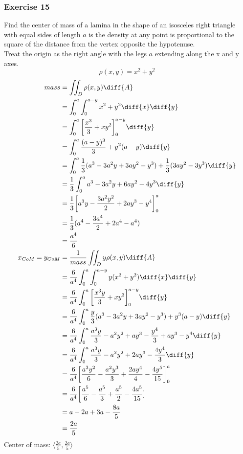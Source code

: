 \documentclass{math}
\begin{document}
\subsubsection*{Exercise 15}
Find the center of mass of a lamina in the shape of an isosceles right triangle
with equal sides of length \( a \) is the density at any point is proportional
to the square of the distance from the vertex opposite the hypotenuse. \\
Treat the origin as the right angle with the legs \( a \) extending along the x
and y axes.
\[ \rho(x,y) = x^2+y^2 \]
\begin{align*}
  mass &= \iint_{D}\rho(x,y)\diff{A} \\
  &= \int_{0}^{a}\int_{0}^{a-y}x^2+y^2\diff{x}\diff{y} \\
  &= \int_{0}^{a}\bigg[\frac{x^3}{3}+xy^2\bigg]_{0}^{a-y}\diff{y} \\
  &= \int_{0}^{a}\frac{(a-y)^3}{3}+y^2(a-y)\diff{y} \\
  &= \int_{0}^{a}
    \frac{1}{3}(a^3-3a^2y+3ay^2-y^3)+\frac{1}{3}(3ay^2-3y^3)\diff{y} \\
  &= \frac{1}{3}\int_{0}^{a}a^3-3a^2y+6ay^2-4y^3\diff{y} \\
  &= \frac{1}{3}\bigg[a^3y-\frac{3a^2y^2}{2}+2ay^3-y^4\bigg]_{0}^{a} \\
  &= \frac{1}{3}(a^4-\frac{3a^4}{2}+2a^4-a^4) \\
  &= \frac{a^4}{6} \\
  x_{CoM} = y_{CoM} &= \frac{1}{mass}\iint_{D}y\rho(x,y)\diff{A} \\
  &= \frac{6}{a^4}\int_{0}^{a}\int_{0}^{a-y}y(x^2+y^2)\diff{x}\diff{y} \\
  &= \frac{6}{a^4}\int_{0}^{a}
    \bigg[\frac{x^3y}{3}+xy^3\bigg]_{0}^{a-y}\diff{y} \\
  &= \frac{6}{a^4}\int_{0}^{a}
    \frac{y}{3}(a^3-3a^2y+3ay^2-y^3)+y^3(a-y)\diff{y} \\
  &= \frac{6}{a^4}\int_{0}^{a}
    \frac{a^3y}{3}-a^2y^2+ay^3-\frac{y^4}{3}+ay^3-y^4\diff{y} \\
  &= \frac{6}{a^4}\int_{0}^{a}
    \frac{a^3y}{3}-a^2y^2+2ay^3-\frac{4y^4}{3}\diff{y} \\
  &= \frac{6}{a^4}\bigg[\frac{a^3y^2}{6}-\frac{a^2y^3}{3}+\frac{2ay^4}{4}-
    \frac{4y^5}{15}\bigg]_{0}^{a} \\
  &= \frac{6}{a^4}\bigg[
    \frac{a^5}{6}-\frac{a^5}{3}+\frac{a^5}{2}-\frac{4a^5}{15}] \\
  &= a-2a+3a-\frac{8a}{5} \\
  &= \frac{2a}{5}
\end{align*}
Center of mass: \( \langle\frac{2a}{5},\frac{2a}{5}\rangle \)
\end{document}
